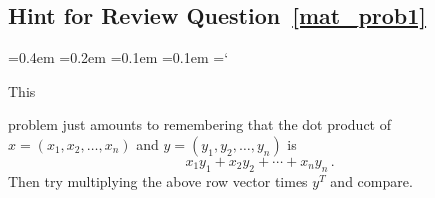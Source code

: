 
\subsection*{Hint for Review Question~\ref{mat_prob1}}

{\ttfamily
{}\font=0.4em
\font=0.2em
\font=0.1em
\font=0.1em
\hyphenchar\font=`\-


\hypertarget{scripts_matrices_hint1}{This } problem just amounts to remembering that the dot product of
$x=(x_1,x_2,\ldots,x_n)$ and $y=(y_1,y_2,\ldots,y_n)$ is 
\[
x_1y_1+ x_2y_2+\cdots + x_n y_n\, .
\] 
Then try multiplying the above row vector times $y^T$ and compare.

} %


